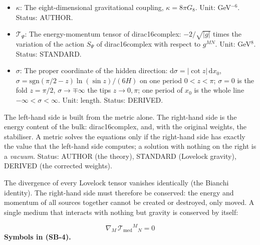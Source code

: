 \documentclass[
  10pt,
]{article}
\begin{document}
\begin{itemize}
  square matrix of the Kronecker deltas \(\delta^{M_a}_{N_b}\) (\(+1\)
  or \(-1\) if the upper indices are an even or odd permutation of the
  lower ones, 0 otherwise). Status: STANDARD.
\item
  \(\kappa\): The eight-dimensional gravitational coupling,
  \(\kappa = 8\pi G_8\). Unit: GeV\(^{-6}\). Status: AUTHOR.
\item
  \(\mathcal{T}_\Psi\): The energy-momentum tensor of dirac16complex:
  \(-2/\sqrt{\lvert g\rvert}\) times the variation of the action
  \(S_\Psi\) of dirac16complex with respect to \(g^{MN}\). Unit:
  GeV\(^8\). Status: STANDARD.
\item
  \(\sigma\): The proper coordinate of the hidden direction:
  \(\mathrm{d}\sigma = \lvert\cot z\rvert\,\mathrm{d}x_0\),
  \(\sigma = \mathrm{sgn}(\pi/2 - z)\ln(\sin z)/(6H)\) on one period
  \(0 < z < \pi\); \(\sigma = 0\) is the fold \(z = \pi/2\),
  \(\sigma \to \mp\infty\) the tips \(z \to 0, \pi\); one period of
  \(x_0\) is the whole line \(-\infty < \sigma < \infty\). Unit: length.
  Status: DERIVED.
\end{itemize}

The left-hand side is built from the metric alone. The right-hand side
is the energy content of the bulk: dirac16complex, and, with the
original weights, the stabiliser. A metric solves the equations only if
the right-hand side has exactly the value that the left-hand side
computes; a solution with nothing on the right is a \emph{vacuum}.
Status: AUTHOR (the theory), STANDARD (Lovelock gravity), DERIVED (the
corrected weights).

The divergence of every Lovelock tensor vanishes identically (the
Bianchi identity). The right-hand side must therefore be conserved: the
energy and momentum of all sources together cannot be created or
destroyed, only moved. A single medium that interacts with nothing but
gravity is conserved by itself:

\[
\nabla_M\,\mathcal{T}_{\mathrm{med}}{}^M{}_N = 0 \tag{SB-4}
\] \textbf{Symbols in (SB-4).}
\end{document}
